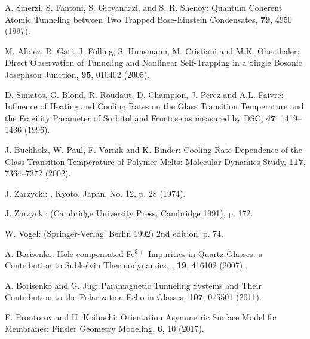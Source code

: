 \documentclass[10pt]{article}
\begin{document}
\begin{thebibliography}{99}
 A. Smerzi, S. Fantoni, S. Giovanazzi, and S. R. Shenoy:
\newblock Quantum Coherent Atomic Tunneling between Two Trapped
Bose-Einstein Condensates,
 {\bf 79}, 4950 (1997).  

M. Albiez, R. Gati, J. F\"olling, S. Hunsmann, M. Cristiani and M.K. Oberthaler:
\newblock Direct Observation of Tunneling and Nonlinear Self-Trapping
in a Single Bosonic Josephson Junction,
 {\bf 95}, 010402 (2005).  

 D. Simatos, G. Blond, R. Roudaut, D. Champion, J. Perez and
A.L. Faivre:
\newblock Influence of Heating and Cooling Rates on the Glass Transition 
Temperature and the Fragility Parameter of Sorbitol and Fructose as measured 
by DSC,
 {\bf 47}, 1419--1436 (1996). 

 J. Buchholz, W. Paul, F. Varnik and K. Binder:
\newblock Cooling Rate Dependence of the Glass Transition Temperature of
Polymer Melts: Molecular Dynamics Study,
 {\bf 117}, 7364--7372 (2002).

 J. Zarzycki:
, Kyoto, Japan, No. 12, p. 28
(1974).

 J. Zarzycki:
 (Cambridge University Press, 
Cambridge 1991), p. 172.

 W. Vogel:
 (Springer-Verlag, Berlin 1992) 2nd edition, p. 74.

 A. Borisenko:
\newblock Hole-compensated Fe$^{3+}$ Impurities in Quartz Glasses:
a Contribution to Subkelvin Thermodynamics,
, {\bf 19}, 416102 (2007) .

 A. Borisenko and G. Jug:
\newblock Paramagnetic Tunneling Systems and Their Contribution to the 
Polarization Echo in Glasses,
 {\bf 107}, 075501 (2011).

 E. Proutorov and H. Koibuchi:
\newblock Orientation Asymmetric Surface Model for Membranes: 
Finsler Geometry Modeling,
 {\bf 6}, 10 (2017).


\end{thebibliography}
\end{document}
